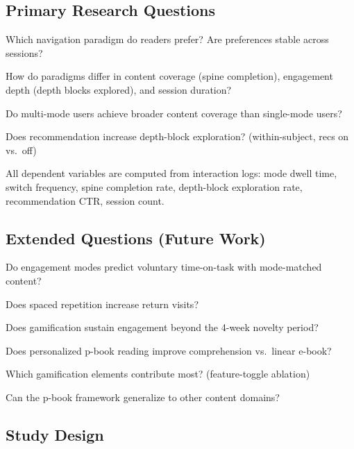 \documentclass[11pt,a4paper]{article}
\begin{document}
\subsection{Primary Research Questions}\label{sec:rq}

\begin{description}[style=nextline]
  \item[RQ1] Which navigation paradigm do readers prefer? Are preferences stable across sessions?
  \item[RQ2] How do paradigms differ in content coverage (spine completion), engagement depth (depth blocks explored), and session duration?
  \item[RQ3] Do multi-mode users achieve broader content coverage than single-mode users?
  \item[RQ4] Does recommendation increase depth-block exploration? (within-subject, recs on vs.\ off)
\end{description}

All dependent variables are computed from interaction logs: mode dwell time, switch frequency, spine completion rate, depth-block exploration rate, recommendation CTR, session count.

\subsection{Extended Questions (Future Work)}

\begin{description}[style=nextline]
  \item[RQ5] Do engagement modes predict voluntary time-on-task with mode-matched content?
  \item[RQ6] Does spaced repetition increase return visits?
  \item[RQ7] Does gamification sustain engagement beyond the 4-week novelty period?
  \item[RQ8] Does personalized p-book reading improve comprehension vs.\ linear e-book?
  \item[RQ9] Which gamification elements contribute most? (feature-toggle ablation)
  \item[RQ10] Can the p-book framework generalize to other content domains?
\end{description}

\subsection{Study Design}
\end{document}

